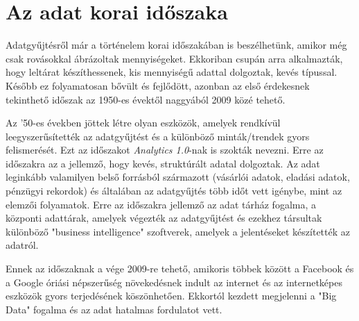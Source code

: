 \section{Az adat korai időszaka}

Adatgyűjtésről már a történelem korai időszakában is beszélhetünk, amikor még csak rovásokkal ábrázoltak mennyiségeket. Ekkoriban csupán arra alkalmazták, hogy leltárat készíthessenek, kis mennyiségű adattal dolgoztak, kevés típussal. Később ez folyamatosan bővült és fejlődött, azonban az első érdekesnek tekinthető időszak az 1950-es évektől naggyából 2009 közé tehető.

Az '50-es években jöttek létre olyan eszközök, amelyek rendkívül leegyszerűsítették az adatgyűjtést és a különböző minták/trendek gyors felismerését. Ezt az időszakot \textit{Analytics 1.0}-nak is szokták nevezni. Erre az időszakra az a jellemző, hogy kevés, struktúrált adatal dolgoztak. Az adat leginkább valamilyen belső forrásból származott (vásárlói adatok, eladási adatok, pénzügyi rekordok) és általában az adatgyűjtés több időt vett igénybe, mint az elemzői folyamatok. Erre az időszakra jellemző az adat tárház fogalma, a központi adattárak, amelyek végezték az adatgyűjtést és ezekhez társultak különböző "business intelligence" szoftverek, amelyek a jelentéseket készítették az adatról.

Ennek az időszaknak a vége 2009-re tehető, amikoris többek között a Facebook és a Google óriási népszerűség növekedésnek indult az internet és az internetképes eszközök gyors terjedésének köszönhetően. Ekkortól kezdett megjelenni a "Big Data" fogalma és az adat hatalmas fordulatot vett.
